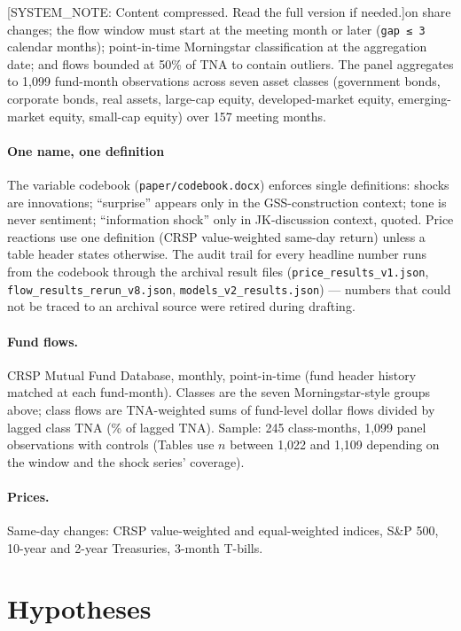 \documentclass[11pt]{article}
\begin{document}
{[}SYSTEM\_NOTE: Content compressed. Read the full version if needed.{]}on share changes; the flow window must start at the meeting month or later (\texttt{gap\ ≤\ 3} calendar months); point-in-time Morningstar classification at the aggregation date; and flows bounded at 50\% of TNA to contain outliers. The panel aggregates to 1,099 fund-month observations across seven asset classes (government bonds, corporate bonds, real assets, large-cap equity, developed-market equity, emerging-market equity, small-cap equity) over 157 meeting months.

\paragraph{One name, one definition}\label{one-name-one-definition}

The variable codebook (\texttt{paper/codebook.docx}) enforces single definitions: shocks are innovations; ``surprise'' appears only in the GSS-construction context; tone is never sentiment; ``information shock'' only in JK-discussion context, quoted. Price reactions use one definition (CRSP value-weighted same-day return) unless a table header states otherwise. The audit trail for every headline number runs from the codebook through the archival result files (\texttt{price\_results\_v1.json}, \texttt{flow\_results\_rerun\_v8.json}, \texttt{models\_v2\_results.json}) --- numbers that could not be traced to an archival source were retired during drafting.

\paragraph{Fund flows.} CRSP Mutual Fund Database, monthly, point-in-time
(fund header history matched at each fund-month). Classes are the seven
Morningstar-style groups above; class flows are TNA-weighted sums of
fund-level dollar flows divided by lagged class TNA
(\% of lagged TNA). Sample: 245 class-months, 1,099 panel observations with
controls (Tables use $n$ between 1,022 and 1,109 depending on the window and
the shock series' coverage).

\paragraph{Prices.} Same-day changes: CRSP value-weighted and equal-weighted
indices, S\&P 500, 10-year and 2-year Treasuries, 3-month T-bills.

\section{Hypotheses}\label{sec:hypotheses}
\end{document}
